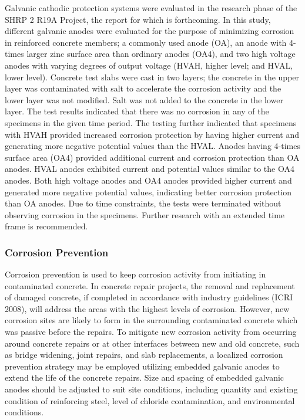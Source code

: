 Galvanic cathodic protection systems were evaluated in the research phase of the SHRP 2 R19A Project, the
report for which is forthcoming. In this study, different galvanic anodes were evaluated for the purpose of
minimizing corrosion in reinforced concrete members; a commonly used anode (OA), an anode with 4-times larger
zinc surface area than ordinary anodes (OA4), and two high voltage anodes with varying degrees of output voltage
(HVAH, higher level; and HVAL, lower level). Concrete test slabs were cast in two layers; the concrete in the upper
layer was contaminated with salt to accelerate the corrosion activity and the lower layer was not modified. Salt was
not added to the concrete in the lower layer. The test results indicated that there was no corrosion in any of the
specimens in the given time period. The testing further indicated that specimens with HVAH provided increased
corrosion protection by having higher current and generating more negative potential values than the HVAL.
Anodes having 4-times surface area (OA4) provided additional current and corrosion protection than OA anodes. HVAL anodes exhibited current and potential values similar to the OA4 anodes. Both high voltage anodes and OA4
anodes provided higher current and generated more negative potential values, indicating better corrosion protection
than OA anodes. Due to time constraints, the tests were terminated without observing corrosion in the specimens.
Further research with an extended time frame is recommended.

\subsubsection{Corrosion Prevention}
Corrosion prevention is used to keep corrosion activity from initiating in contaminated concrete. In concrete
repair projects, the removal and replacement of damaged concrete, if completed in accordance with industry
guidelines (ICRI 2008), will address the areas with the highest levels of corrosion. However, new corrosion sites are
likely to form in the surrounding contaminated concrete which was passive before the repairs. To mitigate new
corrosion activity from occurring around concrete repairs or at other interfaces between new and old concrete, such
as bridge widening, joint repairs, and slab replacements, a localized corrosion prevention strategy may be employed
utilizing embedded galvanic anodes to extend the life of the concrete repairs. Size and spacing of embedded galvanic
anodes should be adjusted to suit site conditions, including quantity and existing condition of reinforcing steel, level
of chloride contamination, and environmental conditions.

